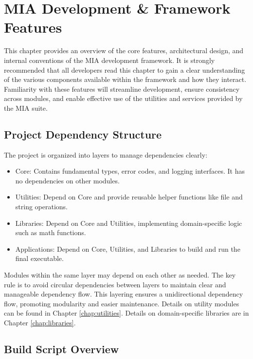 \chapter{MIA Development \& Framework Features}
\pagestyle{fancy}

This chapter provides an overview of the core features, architectural design, and internal conventions of the MIA development framework. It is strongly recommended that all developers read this chapter to gain a clear understanding of the various components available within the framework and how they interact. Familiarity with these features will streamline development, ensure consistency across modules, and enable effective use of the utilities and services provided by the MIA suite.




\section{Project Dependency Structure}
\label{sec:dependancy-structure}

The project is organized into layers to manage dependencies clearly:
\begin{itemize}\itemsep0em
\item Core: Contains fundamental types, error codes, and logging interfaces. It has no dependencies on other modules.
\item Utilities: Depend on Core and provide reusable helper functions like file and string operations.
\item Libraries: Depend on Core and Utilities, implementing domain-specific logic such as math functions.
\item Applications: Depend on Core, Utilities, and Libraries to build and run the final executable.
\end{itemize}
Modules within the same layer may depend on each other as needed. The key rule is to avoid circular dependencies between layers to maintain clear and manageable dependency flow. This layering ensures a unidirectional dependency flow, promoting modularity and easier maintenance. Details on utility modules can be found in Chapter \ref{chap:utilities}. Details on domain-specific libraries are in Chapter \ref{chap:libraries}.







\section{Build Script Overview}
\label{sec:build-script}


